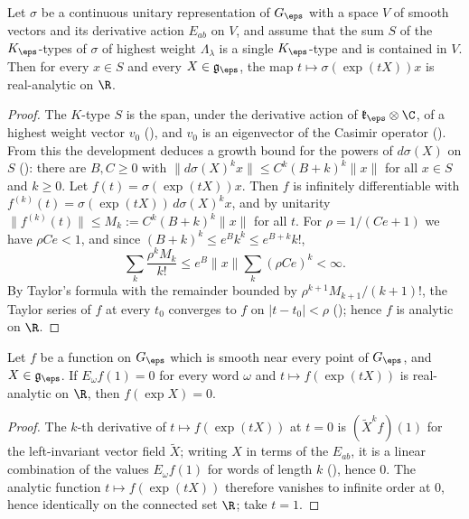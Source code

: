 \begin{lemma}\label{pf:sh-flag:lowkan}
Let $\sigma$ be a continuous unitary representation of $G_\eps$ with a space $V$ of smooth vectors and its derivative
action $E_{ab}$ on $V$, and assume that the sum $S$ of the $K_\eps$-types of $\sigma$ of highest weight $\Lambda_\lambda$ is a single
$K_\eps$-type and is contained in $V$. Then for every
$x\in S$ and every $X\in\mathfrak g_\eps$, the map $t\mapsto\sigma(\exp(tX))x$ is real-analytic on $\R$.
\end{lemma}

\begin{proof}
The $K$-type $S$ is the span, under the derivative action of $\mathfrak k_\eps\otimes\C$, of a highest weight vector $v_0$
(), and $v_0$ is an eigenvector of the Casimir operator
(). From this the development deduces a growth bound for the powers of
$d\sigma(X)$ on $S$ (): there are $B,C\ge0$ with
$\|d\sigma(X)^kx\|\le C^k(B+k)^k\|x\|$ for all $x\in S$ and $k\ge0$. Let $f(t)=\sigma(\exp(tX))x$. Then $f$ is infinitely
differentiable with $f^{(k)}(t)=\sigma(\exp(tX))\,d\sigma(X)^kx$, and by unitarity $\|f^{(k)}(t)\|\le M_k:=C^k(B+k)^k\|x\|$
for all $t$. For $\rho=1/(Ce+1)$ we have $\rho Ce<1$, and since $(B+k)^k\le e^Bk^k\le e^{B+k}k!$,
\[
\sum_k\frac{\rho^kM_k}{k!}\le e^B\|x\|\sum_k(\rho Ce)^k<\infty .
\]
By Taylor's formula with the remainder bounded by $\rho^{k+1}M_{k+1}/(k+1)!$, the Taylor series of $f$ at every $t_0$
converges to $f$ on $|t-t_0|<\rho$ (); hence $f$ is analytic on $\R$.
\end{proof}

\begin{lemma}\label{pf:sh-flag:zerojet}
Let $f$ be a function on $G_\eps$ which is smooth near every point of $G_\eps$, and $X\in\mathfrak g_\eps$. If $E_\omega f(1)=0$
for every word $\omega$ and $t\mapsto f(\exp(tX))$ is real-analytic on $\R$, then $f(\exp X)=0$.
\end{lemma}

\begin{proof}
The $k$-th derivative of $t\mapsto f(\exp(tX))$ at $t=0$ is $(\tilde X^kf)(1)$ for the left-invariant vector field $\tilde X$;
writing $X$ in terms of the $E_{ab}$, it is a linear combination of the values $E_\omega f(1)$ for words of length $k$
(), hence $0$. The analytic function $t\mapsto f(\exp(tX))$ therefore
vanishes to infinite order at $0$, hence identically on the connected set $\R$; take $t=1$.
\end{proof}

